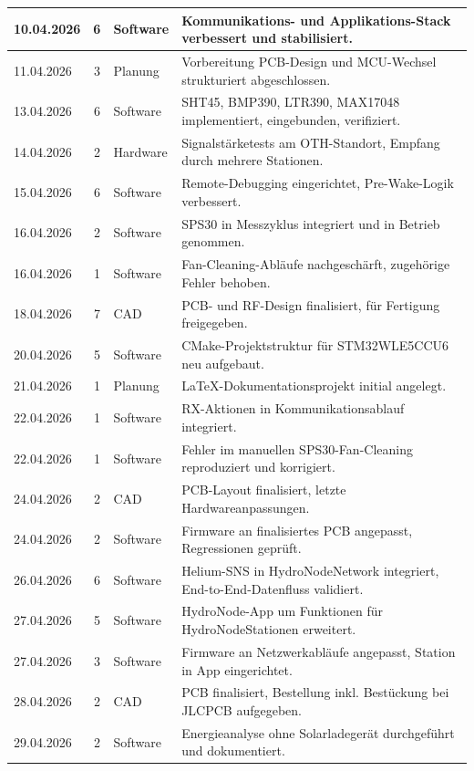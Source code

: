\documentclass[11pt,a4paper]{scrartcl}
\begin{document}
\begin{longtable}{|l|c|l|p{7cm}|}
10.04.2026 & 6 & Software  & Kommunikations- und Applikations-Stack verbessert und stabilisiert. \\ \hline
11.04.2026 & 3 & Planung   & Vorbereitung PCB-Design und MCU-Wechsel strukturiert abgeschlossen. \\ \hline
13.04.2026 & 6 & Software  & SHT45, BMP390, LTR390, MAX17048 implementiert, eingebunden, verifiziert. \\ \hline
14.04.2026 & 2 & Hardware  & Signalstärketests am OTH-Standort, Empfang durch mehrere Stationen. \\ \hline
15.04.2026 & 6 & Software  & Remote-Debugging eingerichtet, Pre-Wake-Logik verbessert. \\ \hline
16.04.2026 & 2 & Software  & SPS30 in Messzyklus integriert und in Betrieb genommen. \\ \hline
16.04.2026 & 1 & Software  & Fan-Cleaning-Abläufe nachgeschärft, zugehörige Fehler behoben. \\ \hline
18.04.2026 & 7 & CAD       & PCB- und RF-Design finalisiert, für Fertigung freigegeben. \\ \hline
20.04.2026 & 5 & Software  & CMake-Projektstruktur für STM32WLE5CCU6 neu aufgebaut. \\ \hline
21.04.2026 & 1 & Planung   & LaTeX-Dokumentationsprojekt initial angelegt. \\ \hline
22.04.2026 & 1 & Software  & RX-Aktionen in Kommunikationsablauf integriert. \\ \hline
22.04.2026 & 1 & Software  & Fehler im manuellen SPS30-Fan-Cleaning reproduziert und korrigiert. \\ \hline
24.04.2026 & 2 & CAD       & PCB-Layout finalisiert, letzte Hardwareanpassungen. \\ \hline
24.04.2026 & 2 & Software  & Firmware an finalisiertes PCB angepasst, Regressionen geprüft. \\ \hline
26.04.2026 & 6 & Software  & Helium-SNS in HydroNodeNetwork integriert, End-to-End-Datenfluss validiert. \\ \hline
27.04.2026 & 5 & Software  & HydroNode-App um Funktionen für HydroNodeStationen erweitert. \\ \hline
27.04.2026 & 3 & Software  & Firmware an Netzwerkabläufe angepasst, Station in App eingerichtet. \\ \hline
28.04.2026 & 2 & CAD       & PCB finalisiert, Bestellung inkl. Bestückung bei JLCPCB aufgegeben. \\ \hline
29.04.2026 & 2 & Software  & Energieanalyse ohne Solarladegerät durchgeführt und dokumentiert. \\ \hline

\end{longtable}
\end{document}
